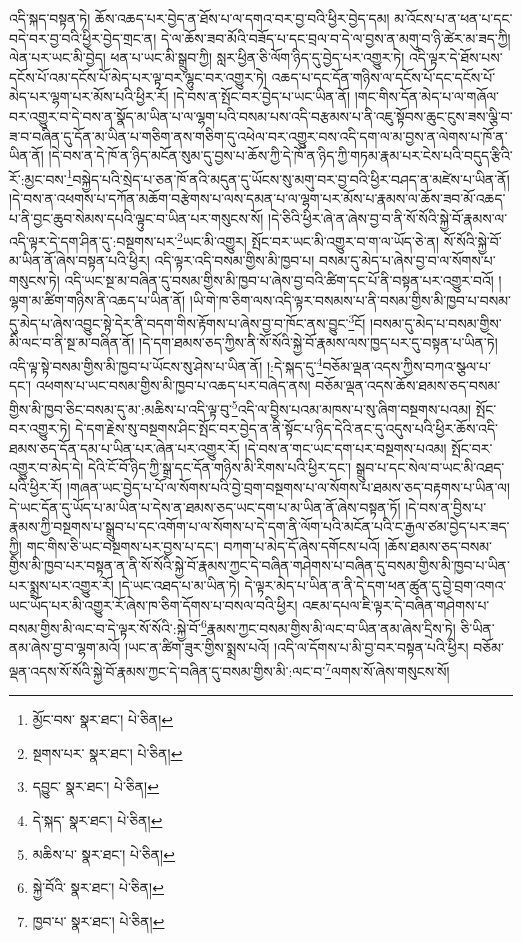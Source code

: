 འདི་སྐད་བསྟན་ཏེ། ཆོས་འཆད་པར་བྱེད་ན་ཐོས་པ་ལ་དགའ་བར་བྱ་བའི་ཕྱིར་བྱེད་དམ། མ་འོངས་པ་ན་ཕན་པ་དང་བདེ་བར་བྱ་བའི་ཕྱིར་བྱེད་གྲང་ན། དེ་ལ་ཆོས་ཟབ་མོའི་བཟོད་པ་དང་བྲལ་བ་དེ་ལ་བྱས་ན་མགུ་བ་ཉི་ཚེར་མ་ཟད་ཀྱི། ལེན་པར་ཡང་མི་བྱེད། ཕན་པ་ཡང་མི་སྒྲུབ་ཀྱི། སླར་ཕྱིན་ཅི་ལོག་ཉིད་དུ་བྱེད་པར་འགྱུར་ཏེ། འདི་ལྟར་དེ་ཐོས་པས་དངོས་པོ་འམ་དངོས་པོ་མེད་པར་ལྟ་བར་ལྷུང་བར་འགྱུར་ཏེ། འཆད་པ་དང་དོན་གཉིས་ལ་དངོས་པོ་དང་དངོས་པོ་མེད་པར་ལྷག་པར་མོས་པའི་ཕྱིར་རོ། །དེ་བས་ན་སྤོང་བར་བྱེད་པ་ཡང་ཡིན་ནོ། །གང་གིས་དོན་མེད་པ་ལ་གཞོལ་བར་འགྱུར་བ་དེ་བས་ན་སྣོད་མ་ཡིན་པ་ལ་ལྷག་པའི་བསམ་པས་འདི་བརྩམས་པ་ནི་འཇུ་སྟོབས་ཆུང་ངུས་ཟས་ལྕི་བ་ཟ་བ་བཞིན་དུ་དོན་མ་ཡིན་པ་གཅིག་ནས་གཅིག་དུ་འཕེལ་བར་འགྱུར་བས་འདི་དག་ལ་མ་བྱས་ན་ལེགས་པ་ཁོ་ན་ཡིན་ནོ། །དེ་བས་ན་དེ་ཁོ་ན་ཉིད་མངོན་སུམ་དུ་བྱས་པ་ཆོས་ཀྱི་དེ་ཁོ་ན་ཉིད་ཀྱི་གཏམ་རྣམ་པར་ངེས་པའི་བདུད་རྩིའི་རོ་:མྱང་བས་\footnote{མྱོང་བས་  སྣར་ཐང་།  པེ་ཅིན། }བསྐྱེད་པའི་སྲེད་པ་ཅན་ཁོ་ནའི་མདུན་དུ་ཡོངས་སུ་མགུ་བར་བྱ་བའི་ཕྱིར་བཤད་ན་མཛེས་པ་ཡིན་ནོ། །དེ་བས་ན་འཕགས་པ་དཀོན་མཆོག་བརྩེགས་པ་ལས་དམན་པ་ལ་ལྷག་པར་མོས་པ་རྣམས་ལ་ཆོས་ཟབ་མོ་འཆད་པ་ནི་བྱང་ཆུབ་སེམས་དཔའི་ལྟུང་བ་ཡིན་པར་གསུངས་སོ། །དེ་ཅིའི་ཕྱིར་ཞེ་ན་ཞེས་བྱ་བ་ནི་སོ་སོའི་སྐྱེ་བོ་རྣམས་ལ་འདི་ལྟར་དེ་དག་ཤིན་དུ་:བསྔགས་པར་\footnote{སྔགས་པར་  སྣར་ཐང་།  པེ་ཅིན། }ཡང་མི་འགྱུར། སྤོང་བར་ཡང་མི་འགྱུར་བ་ག་ལ་ཡོད་ཅེ་ན། སོ་སོའི་སྐྱེ་བོ་མ་ཡིན་ནོ་ཞེས་བསྟན་པའི་ཕྱིར། འདི་ལྟར་འདི་བསམ་གྱིས་མི་ཁྱབ་པ། བསམ་དུ་མེད་པ་ཞེས་བྱ་བ་ལ་སོགས་པ་གསུངས་ཏེ། འདི་ཡང་སྔ་མ་བཞིན་དུ་བསམ་གྱིས་མི་ཁྱབ་པ་ཞེས་བྱ་བའི་ཚིག་དང་པོ་ནི་བསྟན་པར་འགྱུར་བའོ། །ལྷག་མ་ཚིག་གཉིས་ནི་འཆད་པ་ཡིན་ནོ། །ཡི་གེ་ཁ་ཅིག་ལས་འདི་ལྟར་བསམས་པ་ནི་བསམ་གྱིས་མི་ཁྱབ་པ་བསམ་དུ་མེད་པ་ཞེས་འབྱུང་སྟེ་དེར་ནི་བདག་གིས་རྟོགས་པ་ཞེས་བྱ་བ་ཁོང་ནས་བྱུང་\footnote{དབྱུང་  སྣར་ཐང་།  པེ་ཅིན། }ངོ། །བསམ་དུ་མེད་པ་བསམ་གྱིས་མི་ལང་བ་ནི་སྔ་མ་བཞིན་ནོ། །དེ་དག་ཐམས་ཅད་ཀྱིས་ནི་སོ་སོའི་སྐྱེ་བོ་རྣམས་ལས་ཁྱད་པར་དུ་བསྟན་པ་ཡིན་ཏེ། འདི་ལྟ་སྟེ་བསམ་གྱིས་མི་ཁྱབ་པ་ཡོངས་སུ་ཤེས་པ་ཡིན་ནོ། །:དེ་སྐད་དུ་\footnote{དེ་སྐད་  སྣར་ཐང་།  པེ་ཅིན། }བཅོམ་ལྡན་འདས་ཀྱིས་བཀའ་སྩལ་པ་དང་། འཕགས་པ་ཡང་བསམ་གྱིས་མི་ཁྱབ་པ་འཆད་པར་བཞེད་ནས། བཅོམ་ལྡན་འདས་ཆོས་ཐམས་ཅད་བསམ་གྱིས་མི་ཁྱབ་ཅིང་བསམ་དུ་མ་:མཆིས་པ་འདི་ལྟ་བུ་\footnote{མཆིས་པ་  སྣར་ཐང་།  པེ་ཅིན། }འདི་ལ་བྱིས་པའམ་མཁས་པ་སུ་ཞིག་བསྔགས་པའམ། སྤོང་བར་འགྱུར་ཏེ། དེ་དག་རྗེས་སུ་བསྔགས་ཤིང་སྤོང་བར་བྱེད་ན་ནི་སྟོང་པ་ཉིད་དེའི་ནང་དུ་འདུས་པའི་ཕྱིར་ཆོས་འདི་ཐམས་ཅད་དོན་དམ་པ་ཡིན་པར་ཞེན་པར་འགྱུར་རོ། །དེ་བས་ན་གང་ཡང་དག་པར་བསྔགས་པའམ། སྤོང་བར་འགྱུར་བ་མེད་དེ། དེའི་ངོ་བོ་ཉིད་ཀྱི་སྒྲ་དང་དོན་གཉིས་མི་རིགས་པའི་ཕྱིར་དང་། སྒྲུབ་པ་དང་སེལ་བ་ཡང་མི་འཐད་པའི་ཕྱིར་རོ། །གཞན་ཡང་བྱེད་པ་པོ་ལ་སོགས་པའི་བྱེ་བྲག་བསྔགས་པ་ལ་སོགས་པ་ཐམས་ཅད་བརྟགས་པ་ཡིན་ལ། དེ་ཡང་དོན་དུ་ཡོད་པ་མ་ཡིན་པ་དེས་ན་ཐམས་ཅད་ཡང་དག་པ་མ་ཡིན་ནོ་ཞེས་བསྟན་ཏོ། །དེ་བས་ན་བྱིས་པ་རྣམས་ཀྱི་བསྔགས་པ་སྒྲུབ་པ་དང་འགོག་པ་ལ་སོགས་པ་དེ་དག་ནི་ལོག་པའི་མངོན་པའི་ང་རྒྱལ་ཙམ་བྱེད་པར་ཟད་ཀྱི། གང་གིས་ཅི་ཡང་བསྔགས་པར་བྱས་པ་དང་། བཀག་པ་མེད་དོ་ཞེས་དགོངས་པའོ། །ཆོས་ཐམས་ཅད་བསམ་གྱིས་མི་ཁྱབ་པར་བསྟན་ན་ནི་སོ་སོའི་སྐྱེ་བོ་རྣམས་ཀྱང་དེ་བཞིན་གཤེགས་པ་བཞིན་དུ་བསམ་གྱིས་མི་ཁྱབ་པ་ཡིན་པར་སྨྲས་པར་འགྱུར་རོ། །དེ་ཡང་འཐད་པ་མ་ཡིན་ཏེ། དེ་ལྟར་མེད་པ་ཡིན་ན་ནི་དེ་དག་ཕན་ཚུན་དུ་བྱེ་བྲག་འགའ་ཡང་ཡོད་པར་མི་འགྱུར་རོ་ཞེས་ཁ་ཅིག་དོགས་པ་བསལ་བའི་ཕྱིར། འཇམ་དཔལ་ཇི་ལྟར་དེ་བཞིན་གཤེགས་པ་བསམ་གྱིས་མི་ལང་བ་དེ་ལྟར་སོ་སོའི་:སྐྱེ་བོ་\footnote{སྐྱེ་བོའི་  སྣར་ཐང་།  པེ་ཅིན། }རྣམས་ཀྱང་བསམ་གྱིས་མི་ལང་བ་ཡིན་ནམ་ཞེས་དྲིས་ཏེ། ཅི་ཡིན་ནམ་ཞེས་བྱ་བ་ལྷག་མའོ། །ཡང་ན་ཚིག་ཟུར་གྱིས་སྨྲས་པའོ། །འདི་ལ་དོགས་པ་མི་བྱ་བར་བསྟན་པའི་ཕྱིར། བཅོམ་ལྡན་འདས་སོ་སོའི་སྐྱེ་བོ་རྣམས་ཀྱང་དེ་བཞིན་དུ་བསམ་གྱིས་མི་:ལང་བ་\footnote{ཁྱབ་པ་  སྣར་ཐང་།  པེ་ཅིན། }ལགས་སོ་ཞེས་གསུངས་སོ། 